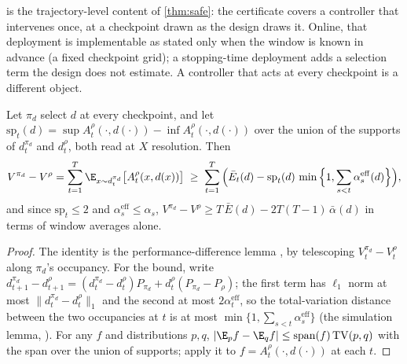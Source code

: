  is the trajectory-level content of \cref{thm:safe}: the
certificate covers a controller that intervenes once, at a checkpoint drawn as
the design draws it.  Online, that deployment is implementable as stated only
when the window is known in advance (a fixed checkpoint grid); a stopping-time
deployment adds a selection term the design does not estimate.  A controller
that acts at every checkpoint is a different object.

\begin{proposition}
\label{prop:transfer}
Let $\pi_d$ select $d$ at every checkpoint, and let
$\mathrm{sp}_t(d)=\sup A^\rho_t(\cdot,d(\cdot))-\inf A^\rho_t(\cdot,d(\cdot))$
over the union of the supports of $d^{\pi_d}_t$ and $d^\rho_t$, both read at
$X$ resolution.  Then
\begin{equation}
 V^{\pi_d}-V^\rho
 =\sum_{t=1}^T\E_{x\sim d^{\pi_d}_t}\big[A^\rho_t(x,d(x))\big]
 \;\ge\;\sum_{t=1}^T\Big(\bar E_t(d)-\mathrm{sp}_t(d)\,\min\Big\{1,\sum_{s<t}\alpha^{\mathrm{eff}}_s(d)\Big\}\Big),
 \label{eq:transfer-bound}
\end{equation}
and since $\mathrm{sp}_t\le2$ and $\alpha^{\mathrm{eff}}_s\le\alpha_s$,
$V^{\pi_d}-V^\rho\ge T\,\bar E(d)-2T(T-1)\,\bar\alpha(d)$ in terms of window
averages alone.
\end{proposition}

\begin{proof}
The identity is the performance-difference lemma \citep{kakade2002}, by telescoping
$V^{\pi_d}_t-V^\rho_t$ along $\pi_d$'s occupancy.  For the bound, write
$d^{\pi_d}_{t+1}-d^\rho_{t+1}=(d^{\pi_d}_t-d^\rho_t)P_{\pi_d}+d^\rho_t(P_{\pi_d}-P_\rho)$;
the first term has $\ell_1$ norm at most $\|d^{\pi_d}_t-d^\rho_t\|_1$ and the
second at most $2\alpha^{\mathrm{eff}}_t$, so the total-variation distance
between the two occupancies at $t$ is at most
$\min\{1,\sum_{s<t}\alpha^{\mathrm{eff}}_s\}$ (the simulation lemma,
\citealp{kearnssingh2002}).  For any
$f$ and distributions $p,q$, $|\E_pf-\E_qf|\le\mathrm{span}(f)\,\mathrm{TV}(p,q)$
with the span over the union of supports; apply it to
$f=A^\rho_t(\cdot,d(\cdot))$ at each $t$.
\end{proof}

